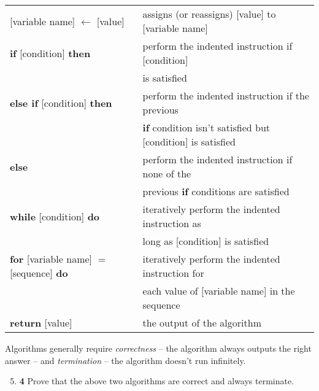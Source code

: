 \documentclass[12pt]{article}
\theoremstyle{plain}
\theoremstyle{definition}
\theoremstyle{remark}
\newcommand{\pts}[1]{\lbrack\textbf{#1}\rbrack}
\begin{document}
\begin{center}
\begin{tabular}{l|l}
[variable name] $\gets$ [value] & assigns (or reassigns) [value] to [variable name] \\
\textbf{if} [condition] \textbf{then} & perform the indented instruction if [condition] \\
& is satisfied \\
\textbf{else if} [condition] \textbf{then} & perform the indented instruction if the previous \\ 
& \textbf{if} condition isn't satisfied but [condition] is satisfied \\
\textbf{else} & perform the indented instruction if none of the \\
& previous \textbf{if} conditions are satisfied \\
\textbf{while} [condition] \textbf{do} & iteratively perform the indented instruction as \\ & long as [condition] is satisfied \\
\textbf{for} [variable name] $=$ [sequence] \textbf{do} & iteratively perform the indented instruction for \\
& each value of [variable name] in the sequence \\
\textbf{return} [value] & the output of the algorithm
\end{tabular}
\end{center}

Algorithms generally require \emph{correctness} -- the algorithm always outputs the right answer -- and \emph{termination} -- the algorithm doesn't run infinitely.

\begin{enumerate}
\setcounter{enumi}{4}

\item \pts{4} Prove that the above two algorithms are correct and always terminate.
\end{enumerate}

\begin{comment}\begin{tcolorbox}
For the first algorithm, we decrease $n$ at each step, so it must terminate since a nonnegative integer cannot decrease infinitely. Also, $n\pmod2$ is preserved at each step, so once $n\in\{0,1\}$ we know $n$ is even iff $n=0$ and $n$ is odd iff $n=1$.

For the second algorithm, $n-i$ decreases at each step, so it must terminate. Also, since $i$ is even, once $n\in\{i,i+1\}$ we will know $n$ is even iff $n=i$ and $n$ is odd iff $n=i+1$.
\end{tcolorbox}\end{comment}
\end{document}
